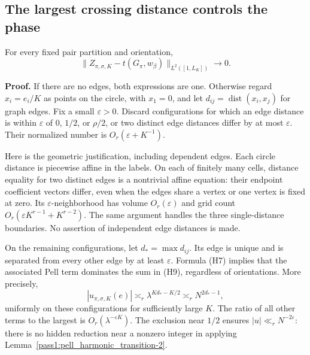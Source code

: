 \hypertarget{pell-harmonic-the-largest-crossing-distance-controls-the-phase}{%
\subsection{The largest crossing distance controls the phase}\label{pell-harmonic-the-largest-crossing-distance-controls-the-phase}}

\begin{lemma}\label{pass1:pell_harmonic_transition-3} For every fixed pair partition and orientation,
\[
 \|Z_{\pi,\sigma,K}-t(G_\pi,w_\beta)\|_{L^2([1,L_K])}
       \longrightarrow0.                                    \tag{H14}
\]
\end{lemma}

\textbf{Proof.} If there are no edges, both expressions are one.
Otherwise regard \(x_i=e_i/K\) as points on the circle, with \(x_1=0\),
and let \(d_{ij}=\operatorname{dist}(x_i,x_j)\) for graph edges.
Fix a small \(\varepsilon>0\). Discard configurations for which an edge
distance is within \(\varepsilon\) of \(0\), \(1/2\), or \(\rho/2\), or two
distinct edge distances differ by at most \(\varepsilon\).
Their normalized number is \(O_r(\varepsilon+K^{-1})\).

Here is the geometric justification, including dependent edges. Each circle
distance is piecewise affine in the labels. On each of finitely many cells,
distance equality for two distinct edges is a nontrivial affine equation:
their endpoint coefficient vectors differ, even when the edges share a
vertex or one vertex is fixed at zero. Its \(\varepsilon\)-neighborhood has
volume \(O_r(\varepsilon)\) and grid count \(O_r(\varepsilon K^{r-1}+K^{r-2})\).
The same argument handles the three single-distance boundaries. No assertion
of independent edge distances is made.

On the remaining configurations, let \(d_*=\max d_{ij}\). Its edge is unique
and is separated from every other edge by at least \(\varepsilon\).
Formula (H7) implies that the associated Pell term dominates the sum
in (H9), regardless of orientations. More precisely,
\[
 |u_{\pi,\sigma,K}(e)|\asymp_r
       \lambda^{Kd_*-K/2}\asymp_r N^{2d_*-1},                 \tag{H15}
\]
uniformly on these configurations for sufficiently large \(K\).
The ratio of all other terms to the largest is
\(O_r(\lambda^{-\varepsilon K})\). The exclusion near \(1/2\) ensures
\(|u|\ll_r N^{-2\varepsilon}\): there is no hidden reduction near a nonzero
integer in applying Lemma~\ref{pass1:pell_harmonic_transition-2}.

